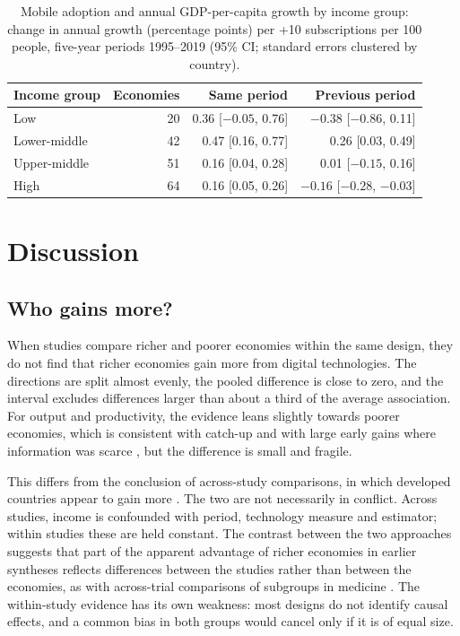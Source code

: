 \documentclass[11pt,a4paper]{article}
\begin{document}
\begin{table}[ht]\centering\small
\caption{Mobile adoption and annual GDP-per-capita growth by income group: change in annual growth (percentage points) per +10 subscriptions per 100 people, five-year periods 1995--2019 (95\% CI; standard errors clustered by country).}\label{tab:panelshort}
\begin{tabular}{@{}lrrr@{}}\toprule
Income group & Economies & Same period & Previous period\\\midrule
Low & 20 & 0.36 [$-0.05$, 0.76] & $-0.38$ [$-0.86$, 0.11]\\
Lower-middle & 42 & 0.47 [0.16, 0.77] & 0.26 [0.03, 0.49]\\
Upper-middle & 51 & 0.16 [0.04, 0.28] & 0.01 [$-0.15$, 0.16]\\
High & 64 & 0.16 [0.05, 0.26] & $-0.16$ [$-0.28$, $-0.03$]\\\bottomrule
\end{tabular}\end{table}

\section{Discussion}\label{sec:discussion}

\subsection{Who gains more?}
When studies compare richer and poorer economies within the same design, they do not find that richer economies gain more from digital technologies. The directions are split almost evenly, the pooled difference is close to zero, and the interval excludes differences larger than about a third of the average association. For output and productivity, the evidence leans slightly towards poorer economies, which is consistent with catch-up and with large early gains where information was scarce \cite{jensen2007,aker2010}, but the difference is small and fragile.

This differs from the conclusion of across-study comparisons, in which developed countries appear to gain more \cite{stanley2018,foster2026}. The two are not necessarily in conflict. Across studies, income is confounded with period, technology measure and estimator; within studies these are held constant. The contrast between the two approaches suggests that part of the apparent advantage of richer economies in earlier syntheses reflects differences between the studies rather than between the economies, as with across-trial comparisons of subgroups in medicine \cite{fisher2017}. The within-study evidence has its own weakness: most designs do not identify causal effects, and a common bias in both groups would cancel only if it is of equal size.
\end{document}
